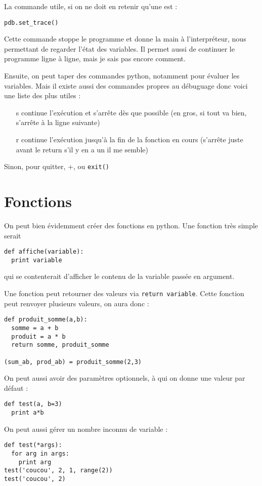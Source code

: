 \documentclass[a4paper,twoside]{article}
\begin{document}
La commande utile, si on ne doit en retenir qu'une est :
\begin{verbatim}
pdb.set_trace()
\end{verbatim}

Cette commande stoppe le programme et donne la main à l'interpréteur, nous permettant de regarder l'état des variables. Il permet aussi de continuer le programme ligne à ligne, mais je sais pas encore comment.

Ensuite, on peut taper des commandes python, notamment pour évaluer les variables. Mais il existe aussi des commandes propres au débuguage donc voici une liste des plus utiles :
\begin{itemize}
\item[s] continue l'exécution et s'arrête dès que possible (en gros, si tout va bien, s'arrête à la ligne suivante)
\item[r] continue l'exécution jusqu'à la fin de la fonction en cours (s'arrête juste avant le return s'il y en a un il me semble)
\end{itemize}
Sinon, pour quitter, +, ou \texttt{exit()}

\section{Fonctions}
On peut bien évidemment créer des fonctions en python. Une fonction très simple serait
\begin{verbatim}
def affiche(variable):
  print variable
\end{verbatim}
qui se contenterait d'afficher le contenu de la variable passée en argument.

Une fonction peut retourner des valeurs via \verb|return variable|. Cette fonction peut renvoyer plusieurs valeurs, on aura donc :
\begin{verbatim}
def produit_somme(a,b):
  somme = a + b
  produit = a * b
  return somme, produit_somme

(sum_ab, prod_ab) = produit_somme(2,3)
\end{verbatim}

On peut aussi avoir des paramètres optionnels, à qui on donne une valeur par défaut :
\begin{verbatim}
def test(a, b=3)
  print a*b
\end{verbatim}

On peut aussi gérer un nombre inconnu de variable :
\begin{verbatim}
def test(*args):
  for arg in args:
    print arg
test('coucou', 2, 1, range(2))
test('coucou', 2)
\end{verbatim}
\end{document}
